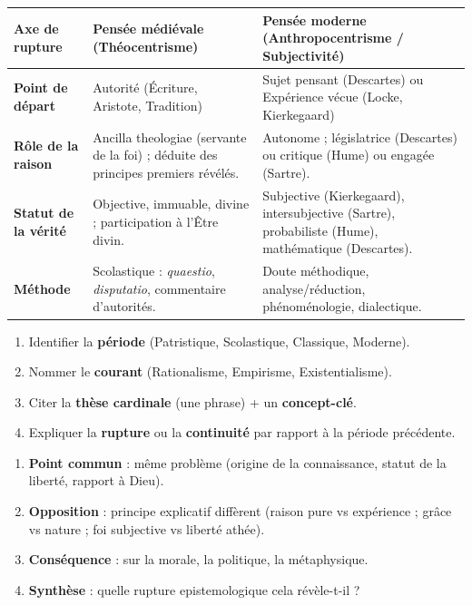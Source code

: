\documentclass[11pt]{article}
\newcommand{\cle}[1]{{\popxbold\color{popdark}#1}}
\newcounter{popsec}
\newcounter{popsub}
\newcommand{\courssub}[1]{%
  \stepcounter{popsub}%
  \par\vspace{9pt}\noindent{\popxbold\fontsize{11.5}{13}\selectfont\color{popink}{\color{poporange}\thepopsec.\thepopsub}\hspace{6pt}#1}\par\nopagebreak\vspace{4pt}
}
\begin{document}
\begin{bilan}
\begin{center}
\begin{tabularx}{\linewidth}{|>{\bfseries}l|X|X|}\hline
\rowcolor{poporangeL}
\textbf{Axe de rupture} & \textbf{Pensée médiévale (Théocentrisme)} & \textbf{Pensée moderne (Anthropocentrisme / Subjectivité)} \\\hline
\textbf{Point de départ} & Autorité (Écriture, Aristote, Tradition) & \cle{Sujet pensant} (Descartes) ou \cle{Expérience vécue} (Locke, Kierkegaard) \\\hline
\textbf{Rôle de la raison} & \cle{Ancilla theologiae} (servante de la foi) ; déduite des principes premiers révélés. & \cle{Autonome} ; législatrice (Descartes) ou critique (Hume) ou engagée (Sartre). \\\hline
\textbf{Statut de la vérité} & Objective, immuable, divine ; \cle{participation} à l'Être divin. & Subjective (Kierkegaard), intersubjective (Sartre), probabiliste (Hume), mathématique (Descartes). \\\hline
\textbf{Méthode} & \cle{Scolastique} : \emph{quaestio}, \emph{disputatio}, commentaire d'autorités. & \cle{Doute méthodique}, \cle{analyse/réduction}, \cle{phénoménologie}, \cle{dialectique}. \\\hline
\end{tabularx}
\end{center}

\courssub{Méthodes express (Bac)}

\begin{methode}
\begin{enumerate}
\item Identifier la \textbf{période} (Patristique, Scolastique, Classique, Moderne).
\item Nommer le \textbf{courant} (Rationalisme, Empirisme, Existentialisme).
\item Citer la \textbf{thèse cardinale} (une phrase) + un \textbf{concept-clé}.
\item Expliquer la \textbf{rupture} ou la \textbf{continuité} par rapport à la période précédente.
\end{enumerate}
\end{methode}

\begin{methode}
\begin{enumerate}
\item \textbf{Point commun} : même problème (origine de la connaissance, statut de la liberté, rapport à Dieu).
\item \textbf{Opposition} : principe explicatif diffèrent (raison pure vs expérience ; grâce vs nature ; foi subjective vs liberté athée).
\item \textbf{Conséquence} : sur la morale, la politique, la métaphysique.
\item \textbf{Synthèse} : quelle rupture epistemologique cela révèle-t-il ?
\end{enumerate}
\end{methode}

\end{bilan}
\end{document}
